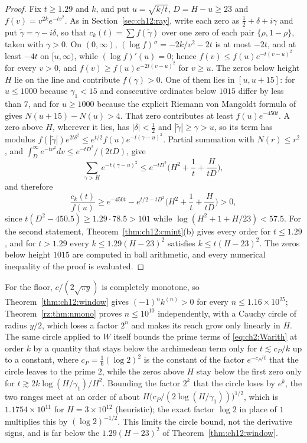 \begin{proof}
Fix $t\ge1.29$ and $k$, and put $u=\sqrt{k/t}$, $D=H-u\ge23$ and $f(v)=v^{2k}e^{-tv^2}$. As in Section~\ref{sec:ch12:ray}, write each zero as $\frac12+\delta+i\gamma$ and put $\tilde\gamma=\gamma-i\delta$, so that $c_k(t)=\sum f(\tilde\gamma)$ over one zero of each pair $\{\rho,1-\rho\}$, taken with $\gamma>0$. On $(0,\infty)$, $(\log f)''=-2k/v^2-2t$ is at most $-2t$, and at least $-4t$ on $[u,\infty)$, while $(\log f)'(u)=0$; hence $f(v)\le f(u)e^{-t(v-u)^2}$ for every $v>0$, and $f(v)\ge f(u)e^{-2t(v-u)^2}$ for $v\ge u$. The zeros below height $H$ lie on the line and contribute $f(\gamma)>0$. One of them lies in $[u,u+15]$: for $u\le1000$ because $\gamma_1<15$ and consecutive ordinates below $1015$ differ by less than $7$, and for $u\ge1000$ because the explicit Riemann von Mangoldt formula of \cite[(1.7) and Corollary~1.4]{HSW22} gives $N(u+15)-N(u)>4$. That zero contributes at least $f(u)e^{-450t}$. A zero above $H$, wherever it lies, has $|\delta|<\frac12$ and $|\tilde\gamma|\ge\gamma>u$, so its term has modulus $f(|\tilde\gamma|)e^{2t\delta^2}\le e^{t/2}f(u)e^{-t(\gamma-u)^2}$. Partial summation with $N(r)\le r^2$, and $\int_D^\infty e^{-tv^2}dv\le e^{-tD^2}/(2tD)$, give
\[
\sum_{\gamma>H}e^{-t(\gamma-u)^2}\le e^{-tD^2}\Big(H^2+\frac1t+\frac H{tD}\Big),
\]
and therefore
\[
\frac{c_k(t)}{f(u)}\ge e^{-450t}-e^{t/2-tD^2}\Big(H^2+\frac1t+\frac H{tD}\Big)>0,
\]
since $t(D^2-450.5)\ge1.29\cdot78.5>101$ while $\log(H^2+1+H/23)<57.5$. For the second statement, Theorem~\ref{thm:ch12:cmint}(b) gives every order for $t\le1.29$, and for $t>1.29$ every $k\le1.29(H-23)^2$ satisfies $k\le t(H-23)^2$. The zeros below height $1015$ are computed in ball arithmetic, and every numerical inequality of the proof is evaluated.
\end{proof}

For the floor, $c/(2\sqrt{\pi y})$ is completely monotone, so Theorem~\ref{thm:ch12:window} gives $(-1)^nk^{(n)}>0$ for every $n\le1.16\times10^{25}$; Theorem~\ref{rz:thm:nmono} proves $n\le10^{10}$ independently, with a Cauchy circle of radius $y/2$, which loses a factor $2^n$ and makes its reach grow only linearly in $H$. The same circle applied to $W$ itself \cite{P26pg3} bounds the prime terms of \eqref{eq:ch2:Warith} at order $k$ by a quantity that stays below the archimedean term only for $t\lesssim c_P/k$ up to a constant, where $c_P=\frac16(\log2)^2$ is the constant of the factor $e^{-c_P/t}$ that the circle leaves to the prime $2$, while the zeros above $H$ stay below the first zero only for $t\gtrsim2k\log(H/\gamma_1)/H^2$. Bounding the factor $2^k$ that the circle loses by $e^k$, the two ranges meet at an order of about $H\big(c_P/(2\log(H/\gamma_1))\big)^{1/2}$, which is $1.1754\times10^{11}$ for $H=3\times10^{12}$ (heuristic); the exact factor $\log2$ in place of $1$ multiplies this by $(\log2)^{-1/2}$. This limits the circle bound, not the derivative signs, and is far below the $1.29(H-23)^2$ of Theorem~\ref{thm:ch12:window}.

